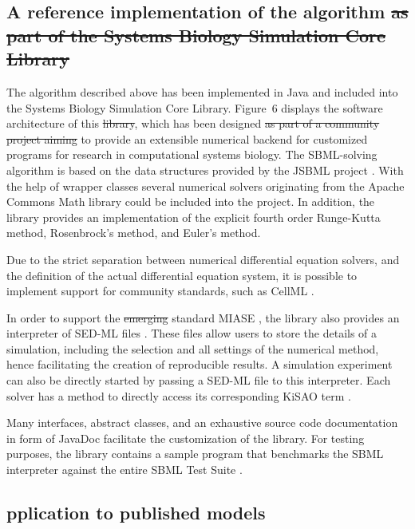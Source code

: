 \documentclass[10pt]{bmc_article}
\newenvironment{bmcformat}{\fussy\setboolean{publ}{true}}{\fussy}
\begin{document}
\begin{bmcformat}
\subsection*{A reference implementation of the algorithm \sout{as part of the Systems
Biology Simulation Core Library}}

The algorithm described above has been implemented in Java\texttrademark{} and
included into the Systems Biology Simulation Core Library.
Figure~6 displays  the software architecture of this
\sout{library}, which has been designed 
\sout{as part of a community project aiming}
to provide an extensible numerical backend for customized programs for research
in computational systems biology.
The \acs{SBML}-solving algorithm is based on the data structures provided by the
JSBML project \cite{Draeger2008}.
With the help of wrapper classes several numerical solvers originating from the
Apache Commons Math library  could be included
into the project.
In addition, the library provides an implementation of the explicit fourth order
Runge-Kutta method, Rosenbrock's method, and Euler's method.

Due to the strict separation between numerical differential equation solvers,
and the definition of the actual differential equation system, it is possible to
implement support for  community standards, such as CellML
\cite{Lloyd2004}.

In order to support the \sout{emerging} standard \acf{MIASE}
\cite{Waltemath2011a}, the library also provides an interpreter of \acf{SED-ML}
files \cite{Waltemath2011}.
These files allow users to store the details of a simulation, including the
selection and all settings of the numerical method, hence facilitating the
creation of reproducible results.
A simulation experiment can also be directly started by passing a \acs{SED-ML}
file to this interpreter.
Each solver has a method to directly access its corresponding \acf{KiSAO} term
\cite{Courtot2011} .

Many interfaces, abstract classes, and an exhaustive source code documentation
in  form of JavaDoc facilitate the customization of the library.
For testing purposes, the library contains a sample program that benchmarks the
\acs{SBML} interpreter against the entire SBML Test Suite
.

\subsection*{pplication to published models}


\end{bmcformat}
\end{document}
